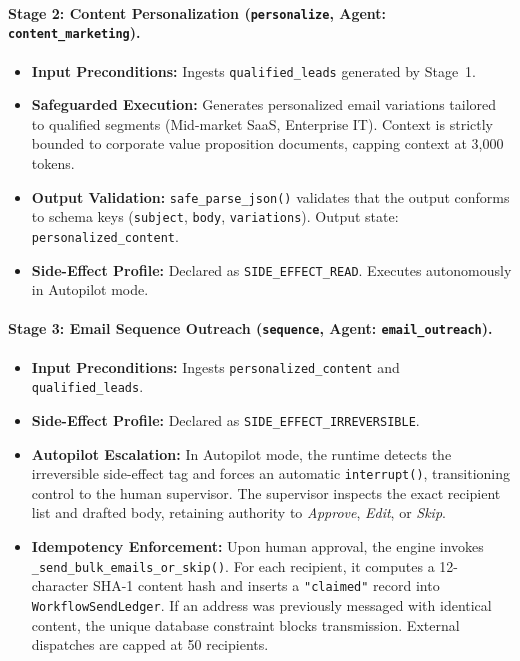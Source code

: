 \documentclass[10pt,a4paper,twocolumn]{article}
\begin{document}
\paragraph{Stage 2: Content Personalization (\texttt{personalize}, Agent: \texttt{content\_marketing}).}
\begin{itemize}[leftmargin=*]
  \item \textbf{Input Preconditions:} Ingests \texttt{qualified\_leads} generated by Stage~1.
  \item \textbf{Safeguarded Execution:} Generates personalized email variations tailored to qualified segments (Mid-market SaaS, Enterprise IT). Context is strictly bounded to corporate value proposition documents, capping context at 3,000 tokens.
  \item \textbf{Output Validation:} \texttt{safe\_parse\_json()} validates that the output conforms to schema keys (\texttt{subject}, \texttt{body}, \texttt{variations}). Output state: \texttt{personalized\_content}.
  \item \textbf{Side-Effect Profile:} Declared as \texttt{SIDE\_EFFECT\_READ}. Executes autonomously in Autopilot mode.
\end{itemize}

\paragraph{Stage 3: Email Sequence Outreach (\texttt{sequence}, Agent: \texttt{email\_outreach}).}
\begin{itemize}[leftmargin=*]
  \item \textbf{Input Preconditions:} Ingests \texttt{personalized\_content} and \texttt{qualified\_leads}.
  \item \textbf{Side-Effect Profile:} Declared as \texttt{SIDE\_EFFECT\_IRREVERSIBLE}.
  \item \textbf{Autopilot Escalation:} In Autopilot mode, the runtime detects the irreversible side-effect tag and forces an automatic \texttt{interrupt()}, transitioning control to the human supervisor. The supervisor inspects the exact recipient list and drafted body, retaining authority to \emph{Approve}, \emph{Edit}, or \emph{Skip}.
  \item \textbf{Idempotency Enforcement:} Upon human approval, the engine invokes \texttt{\_send\_bulk\_emails\_or\_skip()}. For each recipient, it computes a 12-character SHA-1 content hash and inserts a \texttt{"claimed"} record into \texttt{WorkflowSendLedger}. If an address was previously messaged with identical content, the unique database constraint blocks transmission. External dispatches are capped at 50 recipients.
\end{itemize}
\end{document}
